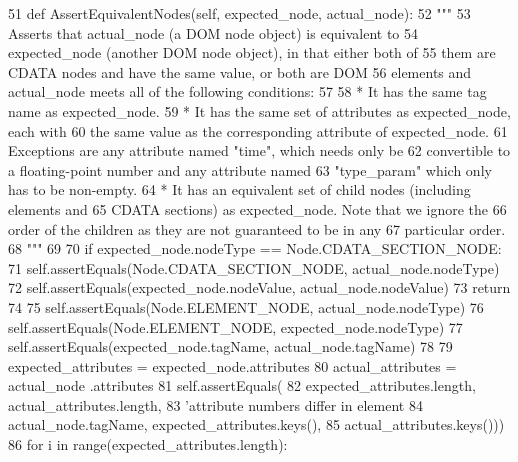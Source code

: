 \begin{DoxyCode}
51   \textcolor{keyword}{def }AssertEquivalentNodes(self, expected\_node, actual\_node):
52     \textcolor{stringliteral}{"""}
53 \textcolor{stringliteral}{    Asserts that actual\_node (a DOM node object) is equivalent to}
54 \textcolor{stringliteral}{    expected\_node (another DOM node object), in that either both of}
55 \textcolor{stringliteral}{    them are CDATA nodes and have the same value, or both are DOM}
56 \textcolor{stringliteral}{    elements and actual\_node meets all of the following conditions:}
57 \textcolor{stringliteral}{}
58 \textcolor{stringliteral}{    *  It has the same tag name as expected\_node.}
59 \textcolor{stringliteral}{    *  It has the same set of attributes as expected\_node, each with}
60 \textcolor{stringliteral}{       the same value as the corresponding attribute of expected\_node.}
61 \textcolor{stringliteral}{       Exceptions are any attribute named "time", which needs only be}
62 \textcolor{stringliteral}{       convertible to a floating-point number and any attribute named}
63 \textcolor{stringliteral}{       "type\_param" which only has to be non-empty.}
64 \textcolor{stringliteral}{    *  It has an equivalent set of child nodes (including elements and}
65 \textcolor{stringliteral}{       CDATA sections) as expected\_node.  Note that we ignore the}
66 \textcolor{stringliteral}{       order of the children as they are not guaranteed to be in any}
67 \textcolor{stringliteral}{       particular order.}
68 \textcolor{stringliteral}{    """}
69 
70     \textcolor{keywordflow}{if} expected\_node.nodeType == Node.CDATA\_SECTION\_NODE:
71       self.assertEquals(Node.CDATA\_SECTION\_NODE, actual\_node.nodeType)
72       self.assertEquals(expected\_node.nodeValue, actual\_node.nodeValue)
73       \textcolor{keywordflow}{return}
74 
75     self.assertEquals(Node.ELEMENT\_NODE, actual\_node.nodeType)
76     self.assertEquals(Node.ELEMENT\_NODE, expected\_node.nodeType)
77     self.assertEquals(expected\_node.tagName, actual\_node.tagName)
78 
79     expected\_attributes = expected\_node.attributes
80     actual\_attributes   = actual\_node  .attributes
81     self.assertEquals(
82         expected\_attributes.length, actual\_attributes.length,
83         \textcolor{stringliteral}{'attribute numbers differ in element %
84             actual\_node.tagName, expected\_attributes.keys(),
85             actual\_attributes.keys()))
86     \textcolor{keywordflow}{for} i \textcolor{keywordflow}{in} range(expected\_attributes.length):
}
\end{DoxyCode}
